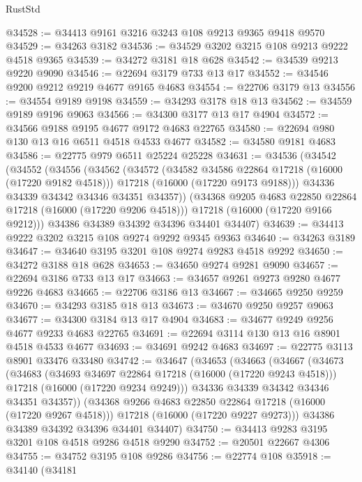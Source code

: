 \begin{lexlean}{RustStd}
\begin{coremodule}
@34528 := @34413 @9161 @3216 @3243 @108 @9213 @9365 @9418 @9570
@34529 := @34263 @3182
@34536 := @34529 @3202 @3215 @108 @9213 @9222 @4518 @9365
@34539 := @34272 @3181 @18 @628
@34542 := @34539 @9213 @9220 @9090
@34546 := @22694 @3179 @733 @13 @17
@34552 := @34546 @9200 @9212 @9219 @4677 @9165 @4683
@34554 := @22706 @3179 @13
@34556 := @34554 @9189 @9198
@34559 := @34293 @3178 @18 @13
@34562 := @34559 @9189 @9196 @9063
@34566 := @34300 @3177 @13 @17 @4904
@34572 := @34566 @9188 @9195 @4677 @9172 @4683 @22765
@34580 := @22694 @980 @130 @13 @16 @6511 @4518 @4533 @4677
@34582 := @34580 @9181 @4683
@34586 := @22775 @979 @6511 @25224 @25228
@34631 := @34536
    (@34542
      (@34552
        (@34556
          (@34562
            (@34572
              (@34582 @34586 @22864 @17218 (@16000 (@17220 @9182 @4518)))
              @17218
              (@16000 (@17220 @9173 @9188)))
            @34336
            @34339
            @34342
            @34346
            @34351
            @34357))
        (@34368 @9205 @4683 @22850 @22864 @17218 (@16000 (@17220 @9206 @4518)))
        @17218
        (@16000 (@17220 @9166 @9212)))
      @34386
      @34389
      @34392
      @34396
      @34401
      @34407)
@34639 := @34413 @9222 @3202 @3215 @108 @9274 @9292 @9345 @9363
@34640 := @34263 @3189
@34647 := @34640 @3195 @3201 @108 @9274 @9283 @4518 @9292
@34650 := @34272 @3188 @18 @628
@34653 := @34650 @9274 @9281 @9090
@34657 := @22694 @3186 @733 @13 @17
@34663 := @34657 @9261 @9273 @9280 @4677 @9226 @4683
@34665 := @22706 @3186 @13
@34667 := @34665 @9250 @9259
@34670 := @34293 @3185 @18 @13
@34673 := @34670 @9250 @9257 @9063
@34677 := @34300 @3184 @13 @17 @4904
@34683 := @34677 @9249 @9256 @4677 @9233 @4683 @22765
@34691 := @22694 @3114 @130 @13 @16 @8901 @4518 @4533 @4677
@34693 := @34691 @9242 @4683
@34697 := @22775 @3113 @8901 @33476 @33480
@34742 := @34647
    (@34653
      (@34663
        (@34667
          (@34673
            (@34683
              (@34693 @34697 @22864 @17218 (@16000 (@17220 @9243 @4518)))
              @17218
              (@16000 (@17220 @9234 @9249)))
            @34336
            @34339
            @34342
            @34346
            @34351
            @34357))
        (@34368 @9266 @4683 @22850 @22864 @17218 (@16000 (@17220 @9267 @4518)))
        @17218
        (@16000 (@17220 @9227 @9273)))
      @34386
      @34389
      @34392
      @34396
      @34401
      @34407)
@34750 := @34413 @9283 @3195 @3201 @108 @4518 @9286 @4518 @9290
@34752 := @20501 @22667 @4306
@34755 := @34752 @3195 @108 @9286
@34756 := @22774 @108
@35918 := @34140
    (@34181

\end{coremodule}
\end{lexlean}
